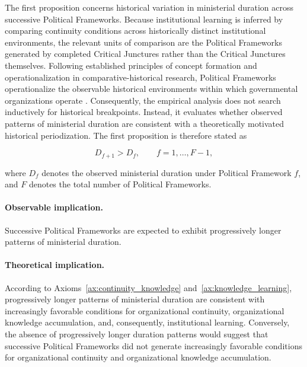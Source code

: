 \documentclass[doc, 12pt, a4paper,floatsintext]{apa7}
\begin{document}
The first proposition concerns historical variation in ministerial duration across successive Political Frameworks. Because institutional learning is inferred by comparing continuity conditions across historically distinct institutional environments, the relevant units of comparison are the Political Frameworks generated by completed Critical Junctures rather than the Critical Junctures themselves. Following established principles of concept formation and operationalization in comparative-historical research, Political Frameworks operationalize the observable historical environments within which governmental organizations operate \parencite{capoccia_study_2007,collier_critical_2022}. Consequently, the empirical analysis does not search inductively for historical breakpoints. Instead, it evaluates whether observed patterns of ministerial duration are consistent with a theoretically motivated historical periodization.
%
The first proposition is therefore stated as

\begin{equation}
\tag{P1}
D_{f+1}>D_f,
\qquad
f=1,\ldots,F-1,
\label{prop:framework_duration}
\end{equation}

where $D_f$ denotes the observed ministerial duration under Political Framework $f$, and $F$ denotes the total number of Political Frameworks.

\paragraph{Observable implication.}

Successive Political Frameworks are expected to exhibit progressively longer patterns of ministerial duration.

\paragraph{Theoretical implication.}

According to Axioms~\ref{ax:continuity_knowledge} and~\ref{ax:knowledge_learning}, progressively longer patterns of ministerial duration are consistent with increasingly favorable conditions for organizational continuity, organizational knowledge accumulation, and, consequently, institutional learning. Conversely, the absence of progressively longer duration patterns would suggest that successive Political Frameworks did not generate increasingly favorable conditions for organizational continuity and organizational knowledge accumulation.
%
\end{document}
